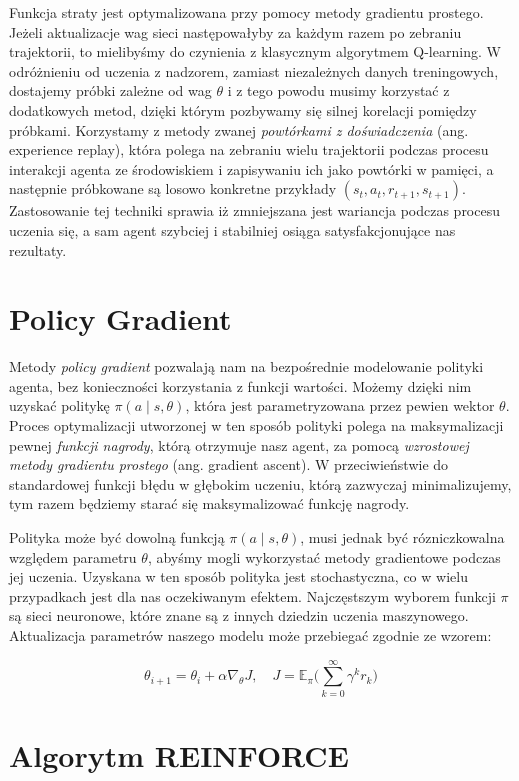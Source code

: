 \documentclass[licencjacka]{pracamgr}
\begin{document}
Funkcja straty jest optymalizowana przy pomocy metody gradientu prostego. Jeżeli aktualizacje wag sieci następowałyby za każdym razem po zebraniu trajektorii, to mielibyśmy do czynienia z klasycznym algorytmem Q-learning. W odróżnieniu od uczenia z nadzorem, zamiast niezależnych danych treningowych, dostajemy próbki zależne od wag $\theta$ i z tego powodu musimy korzystać z dodatkowych metod, dzięki którym pozbywamy się silnej korelacji pomiędzy próbkami. Korzystamy z metody zwanej \emph{powtórkami z doświadczenia} (ang. experience replay), która polega na zebraniu wielu trajektorii podczas procesu interakcji agenta ze środowiskiem i zapisywaniu ich jako powtórki w pamięci, a następnie próbkowane są losowo konkretne przykłady $(s_t, a_t, r_{t+1}, s_{t+1})$. Zastosowanie tej techniki sprawia iż zmniejszana jest wariancja podczas procesu uczenia się, a sam agent szybciej i stabilniej osiąga satysfakcjonujące nas rezultaty.


\section{Policy Gradient}

Metody \emph{policy gradient} pozwalają nam na bezpośrednie modelowanie polityki agenta, bez konieczności korzystania z funkcji wartości. Możemy dzięki nim uzyskać politykę $\pi(a \mid s, \theta)$, która jest parametryzowana przez pewien wektor $\theta$. Proces optymalizacji utworzonej w ten sposób polityki polega na maksymalizacji pewnej \emph{funkcji nagrody}, którą otrzymuje nasz agent, za pomocą \emph{wzrostowej metody gradientu prostego} (ang. gradient ascent). W przeciwieństwie do standardowej funkcji błędu w głębokim uczeniu, którą zazwyczaj minimalizujemy, tym razem będziemy starać się maksymalizować funkcję nagrody.

Polityka może być dowolną funkcją $\pi(a \mid s, \theta)$, musi jednak być rózniczkowalna względem parametru $\theta$, abyśmy mogli wykorzystać metody gradientowe podczas jej uczenia. Uzyskana w ten sposób polityka jest stochastyczna, co w wielu przypadkach jest dla nas oczekiwanym efektem. Najczęstszym wyborem funkcji $\pi$ są sieci neuronowe, które znane są z innych dziedzin uczenia maszynowego. Aktualizacja parametrów naszego modelu może przebiegać zgodnie ze wzorem:

$$ \theta_{i+1} = \theta_i + \alpha \nabla_{\theta}J , \quad
J = \mathbb{E}_{\pi} \Big( \sum_{k = 0}^{\infty} \gamma^k r_k \Big)
$$

\section{Algorytm REINFORCE}
\end{document}
